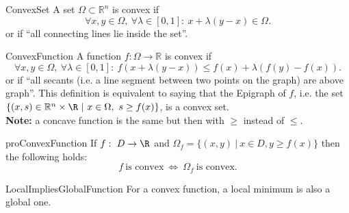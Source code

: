 \begin{theo}{ConvexSet}
    A set $\Omega \subset \mathbb{R}^n$ is convex if 
    \begin{equation*}
        \forall x,y \in \Omega, \ \forall \lambda \in [0,1]: \ x + \lambda(y - x) \in \Omega.
    \end{equation*}
    or if ``all connecting lines lie inside the set''.
\end{theo}

\begin{theo}{ConvexFunction}
    A function $f: \Omega \rightarrow \mathbb{R}$ is convex if 
    \begin{equation*}
        \forall x,y \in \Omega, \ \forall \lambda \in [0,1]: \ f(x + \lambda(y - x)) \leq f(x) + \lambda(f(y) - f(x)).
    \end{equation*}
    or if ``all secants (i\@.e\@. a line segment between two points on the graph) are above graph''. This definition is equivalent to saying that the Epigraph of $f$, i\@.e\@. the set $\{(x,s) \in \mathbb{R}^n \times \R \ | \ x \in \Omega, \ s \geq f(x) \}$, is a convex set. \\

    \textbf{Note:} a concave function is the same but then with $\geq$ instead of $\leq$.
\end{theo}

\begin{pro}{proConvexFunction}
    If $f: \ D \rightarrow \R$ and $\Omega_f = \{ (x,y) \ | \ x \in D, y \geq f(x)\}$ then the following holds:
    \begin{equation*}
        f \ \text{is convex} \ \Leftrightarrow \ \Omega_f \ \text{is convex}.
    \end{equation*}
    \vspace*{-0.5cm}
\end{pro}

\begin{pro}{LocalImpliesGlobalFunction}
    For a convex function, a local minimum is also a global one.
\end{pro}


